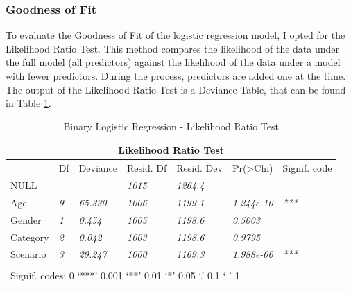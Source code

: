 \documentclass[a4paper]{article}
\begin{document}
\newpage

\subsubsection{Goodness of Fit}

To evaluate the Goodness of Fit of the logistic regression model, I opted for the Likelihood Ratio Test. This method compares the likelihood of the data under the full model (all predictors) against the likelihood of the data under a model with fewer predictors. During the process, predictors are added one at the time. The output of the Likelihood Ratio Test is a Deviance Table, that can be found in Table \ref{tb-deviance}.

\bigskip

\begingroup
\renewcommand{\arraystretch}{1.25}
\begin{table}[ht]
\begin{center}
    \begin{tabular}{ | l | l | l | l | l | l | l | }
    \hline
    \multicolumn{7}{|c|}{\textbf{Likelihood Ratio Test}} \\ \hline
    
    & Df & Deviance & Resid. Df & Resid. Dev & Pr(\textgreater Chi) & Signif. code \\ \hline
    
    NULL & \textit{} & \textit{} & \textit{1015} & \textit{1264.4} & \textit{} & \textit{} \\ \hline
    
    Age & \textit{9} & \textit{65.330} & \textit{1006} & \textit{1199.1} & \textit{1.244e-10} & \textit{***} \\ \hline
    Gender & \textit{1} & \textit{0.454} & \textit{1005} & \textit{1198.6} & \textit{0.5003} & \textit{} \\ \hline
    Category & \textit{2} & \textit{0.042} & \textit{1003} & \textit{1198.6} & \textit{0.9795} & \textit{} \\ \hline
    Scenario & \textit{3} & \textit{29.247} & \textit{1000} & \textit{1169.3} & \textit{1.988e-06} & \textit{***} \\ \hline
    
    \multicolumn{7}{l}{} \\ \hline
    
    \multicolumn{7}{|l|}{Signif. codes:  0 ‘***’ 0.001 ‘**’ 0.01 ‘*’ 0.05 ‘.’ 0.1 ‘ ’ 1} \\ \hline
    
    \end{tabular}
\end{center}
\caption{Binary Logistic Regression - Likelihood Ratio Test}
\label{tb-deviance}
\end{table}
\endgroup
\end{document}
